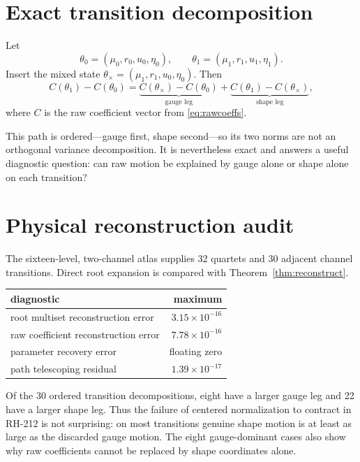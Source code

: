 \documentclass[12pt]{article}
\theoremstyle{remark}\newtheorem{remark}[theorem]{Remark}
\begin{document}
\section{Exact transition decomposition}

Let
\begin{equation}
 \theta_0=(\mu_0,r_0,u_0,\eta_0),\qquad
 \theta_1=(\mu_1,r_1,u_1,\eta_1).
\end{equation}
Insert the mixed state
$\theta_\times=(\mu_1,r_1,u_0,\eta_0)$.  Then
\begin{equation}\label{eq:decomp}
 C(\theta_1)-C(\theta_0)
 =\underbrace{C(\theta_\times)-C(\theta_0)}_{\text{gauge leg}}
 +\underbrace{C(\theta_1)-C(\theta_\times)}_{\text{shape leg}},
\end{equation}
where $C$ is the raw coefficient vector from \eqref{eq:rawcoeffs}.

This path is ordered---gauge first, shape second---so its two norms are not an
orthogonal variance decomposition.  It is nevertheless exact and answers a
useful diagnostic question: can raw motion be explained by gauge alone or
shape alone on each transition?

\section{Physical reconstruction audit}

The sixteen-level, two-channel atlas supplies 32 quartets and 30 adjacent
channel transitions.  Direct root expansion is compared with
Theorem~\ref{thm:reconstruct}.

\begin{center}
\begin{tabular}{lr}
\toprule
diagnostic & maximum\\
\midrule
root multiset reconstruction error & $3.15\times10^{-16}$\\
raw coefficient reconstruction error & $7.78\times10^{-16}$\\
parameter recovery error & floating zero\\
path telescoping residual & $1.39\times10^{-17}$\\
\bottomrule
\end{tabular}
\end{center}

Of the 30 ordered transition decompositions, eight have a larger gauge leg
and 22 have a larger shape leg.  Thus the failure of centered normalization
to contract in RH-212 is not surprising: on most transitions genuine shape
motion is at least as large as the discarded gauge motion.  The eight
gauge-dominant cases also show why raw coefficients cannot be replaced by
shape coordinates alone.
\end{document}
